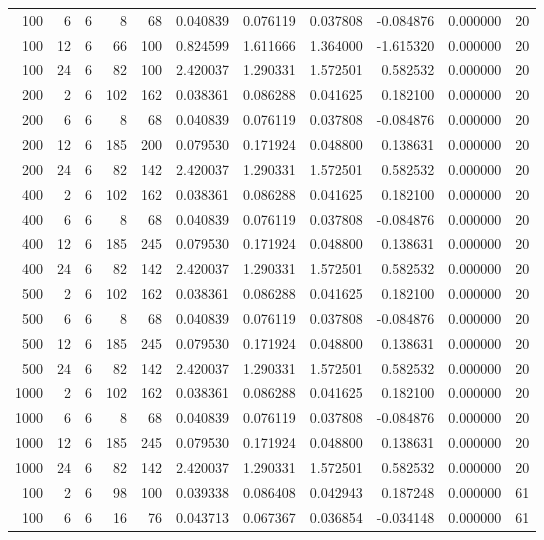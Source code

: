 \begin{table}
\begin{tabular}{rrrrrrrrrrr}
100 & 6 & 6 & 8 & 68 & 0.040839 & 0.076119 & 0.037808 & -0.084876 & 0.000000 & 20 \\
100 & 12 & 6 & 66 & 100 & 0.824599 & 1.611666 & 1.364000 & -1.615320 & 0.000000 & 20 \\
100 & 24 & 6 & 82 & 100 & 2.420037 & 1.290331 & 1.572501 & 0.582532 & 0.000000 & 20 \\
200 & 2 & 6 & 102 & 162 & 0.038361 & 0.086288 & 0.041625 & 0.182100 & 0.000000 & 20 \\
200 & 6 & 6 & 8 & 68 & 0.040839 & 0.076119 & 0.037808 & -0.084876 & 0.000000 & 20 \\
200 & 12 & 6 & 185 & 200 & 0.079530 & 0.171924 & 0.048800 & 0.138631 & 0.000000 & 20 \\
200 & 24 & 6 & 82 & 142 & 2.420037 & 1.290331 & 1.572501 & 0.582532 & 0.000000 & 20 \\
400 & 2 & 6 & 102 & 162 & 0.038361 & 0.086288 & 0.041625 & 0.182100 & 0.000000 & 20 \\
400 & 6 & 6 & 8 & 68 & 0.040839 & 0.076119 & 0.037808 & -0.084876 & 0.000000 & 20 \\
400 & 12 & 6 & 185 & 245 & 0.079530 & 0.171924 & 0.048800 & 0.138631 & 0.000000 & 20 \\
400 & 24 & 6 & 82 & 142 & 2.420037 & 1.290331 & 1.572501 & 0.582532 & 0.000000 & 20 \\
500 & 2 & 6 & 102 & 162 & 0.038361 & 0.086288 & 0.041625 & 0.182100 & 0.000000 & 20 \\
500 & 6 & 6 & 8 & 68 & 0.040839 & 0.076119 & 0.037808 & -0.084876 & 0.000000 & 20 \\
500 & 12 & 6 & 185 & 245 & 0.079530 & 0.171924 & 0.048800 & 0.138631 & 0.000000 & 20 \\
500 & 24 & 6 & 82 & 142 & 2.420037 & 1.290331 & 1.572501 & 0.582532 & 0.000000 & 20 \\
1000 & 2 & 6 & 102 & 162 & 0.038361 & 0.086288 & 0.041625 & 0.182100 & 0.000000 & 20 \\
1000 & 6 & 6 & 8 & 68 & 0.040839 & 0.076119 & 0.037808 & -0.084876 & 0.000000 & 20 \\
1000 & 12 & 6 & 185 & 245 & 0.079530 & 0.171924 & 0.048800 & 0.138631 & 0.000000 & 20 \\
1000 & 24 & 6 & 82 & 142 & 2.420037 & 1.290331 & 1.572501 & 0.582532 & 0.000000 & 20 \\
100 & 2 & 6 & 98 & 100 & 0.039338 & 0.086408 & 0.042943 & 0.187248 & 0.000000 & 61 \\
100 & 6 & 6 & 16 & 76 & 0.043713 & 0.067367 & 0.036854 & -0.034148 & 0.000000 & 61 \\

\end{tabular}
\end{table}

